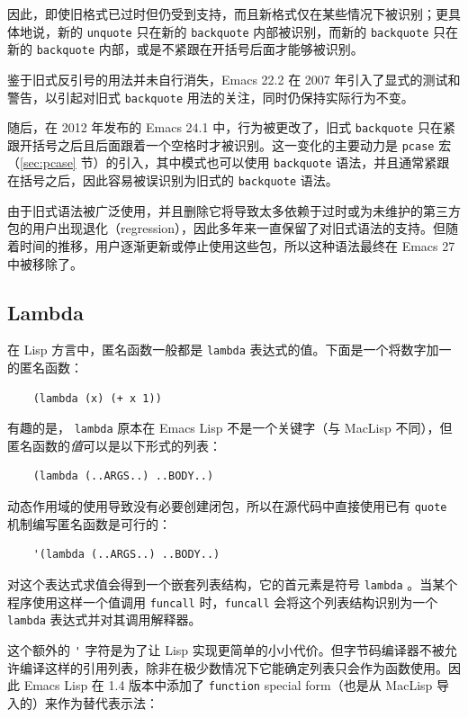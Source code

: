 \documentclass[format=acmsmall,screen]{acmart}
\begin{document}

因此，即使旧格式已过时但仍受到支持，而且新格式仅在某些情况下被识别；更具体地说，新的 \texttt{unquote} 只在新的 \texttt{backquote} 内部被识别，而新的 \texttt{backquote} 只在新的 \texttt{backquote} 内部，或是不紧跟在开括号后面才能够被识别。

鉴于旧式反引号的用法并未自行消失，Emacs 22.2 在 2007 年引入了显式的测试和警告，以引起对旧式 \texttt{backquote} 用法的关注，同时仍保持实际行为不变。

随后，在 2012 年发布的 Emacs 24.1 中，行为被更改了，旧式 \texttt{backquote} 只在紧跟开括号之后且后面跟着一个空格时才被识别。这一变化的主要动力是 \texttt{pcase} 宏（\ref{sec:pcase} 节）的引入，其中模式也可以使用 \texttt{backquote} 语法，并且通常紧跟在括号之后，因此容易被误识别为旧式的 \texttt{backquote} 语法。

由于旧式语法被广泛使用，并且删除它将导致太多依赖于过时或为未维护的第三方包的用户出现退化（regression），因此多年来一直保留了对旧式语法的支持。但随着时间的推移，用户逐渐更新或停止使用这些包，所以这种语法最终在 Emacs 27 中被移除了。

\subsection{Lambda}
\label{sec:lambda}

在 Lisp 方言中，匿名函数一般都是 \texttt{lambda} 表达式的值。下面是一个将数字加一的匿名函数：
%
\begin{verbatim}
    (lambda (x) (+ x 1))
\end{verbatim}
%
有趣的是， \texttt{lambda} 原本在 Emacs Lisp 不是一个关键字（与 MacLisp 不同），但匿名函数的\emph{值}可以是以下形式的列表：
%
\begin{verbatim}
    (lambda (..ARGS..) ..BODY..)
\end{verbatim}
%
动态作用域的使用导致没有必要创建闭包，所以在源代码中直接使用已有 \texttt{quote} 机制编写匿名函数是可行的：
%
\begin{verbatim}
    '(lambda (..ARGS..) ..BODY..)
\end{verbatim}
%
对这个表达式求值会得到一个嵌套列表结构，它的首元素是符号 \texttt{lambda} 。当某个程序使用这样一个值调用 \texttt{funcall} 时，\texttt{funcall} 会将这个列表结构识别为一个 \texttt{lambda} 表达式并对其调用解释器。

这个额外的 \verb|'| 字符是为了让 Lisp 实现更简单的小小代价。但字节码编译器不被允许编译这样的引用列表，除非在极少数情况下它能确定列表只会作为函数使用。因此 Emacs Lisp 在 1.4 版本中添加了 \texttt{function} special form（也是从 MacLisp 导入的）来作为替代表示法：
\end{document}
